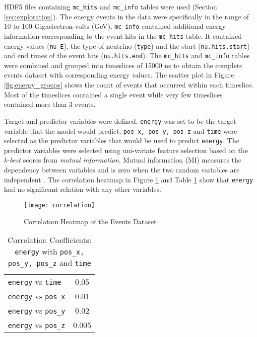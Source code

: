 HDF5 files containing \texttt{mc\_hits} and \texttt{mc\_info} tables were used (Section \ref{sec:exploration}). The energy events in the data were specifically in the range of 10 to 100 Gigaelectron-volts (GeV). \texttt{mc\_info} contained additional energy information corresponding to the event hits in the \texttt{mc\_hits} table. It contained energy values (\texttt{nu\_E}), the type of neutrino (\texttt{type}) and the start (\texttt{nu.hits.start}) and end times of the event hits (\texttt{nu.hits.end}). The \texttt{mc\_hits} and \texttt{mc\_info} tables were combined and grouped into timeslices of 15000 ns to obtain the complete events dataset with corresponding energy values. The scatter plot in Figure \ref{fig:energy_groups} shows the count of events that occurred within each timeslice. Most of the timeslices contained a single event while very few timeslices contained more than 3 events. 


Target and predictor variables were defined. \texttt{energy} was set to be the target variable that the model would predict. \texttt{pos\_x, pos\_y, pos\_z} and \texttt{time} were selected as the predictor variables that would be used to predict \texttt{energy}. The predictor variables were selected using uni-variate feature selection based on the \textit{k-best} scores from \textit{mutual information}. Mutual information (MI) measures the dependency between variables and is zero when the two random variables are independent \cite{kraskov2011erratum}. The correlation heatmap in Figure \ref{fig:correlation} and  Table \ref{tab:pearson}  show that \texttt{energy} had no significant relation with any other variables. 

\begin{figure}[ht!]
    \centering
    \texttt{[image: correlation]}
    \caption{Correlation Heatmap of the Events Dataset}
    \label{fig:correlation}
\end{figure}


\begin{table}[ht!]
    \centering
    \begin{tabular}{l c}
    \hline
        \texttt{energy} vs \texttt{time} & 0.05  \\
        \texttt{energy} vs \texttt{pos\_x}  & 0.01\\
        \texttt{energy} vs \texttt{pos\_y} & 0.02\\
        \texttt{energy} vs \texttt{pos\_z} & 0.005\\
    \hline
    \end{tabular}
    \caption{Correlation Coefficients: \texttt{energy} with \texttt{pos\_x, pos\_y, pos\_z} and \texttt{time}}
    \label{tab:pearson}
\end{table}

